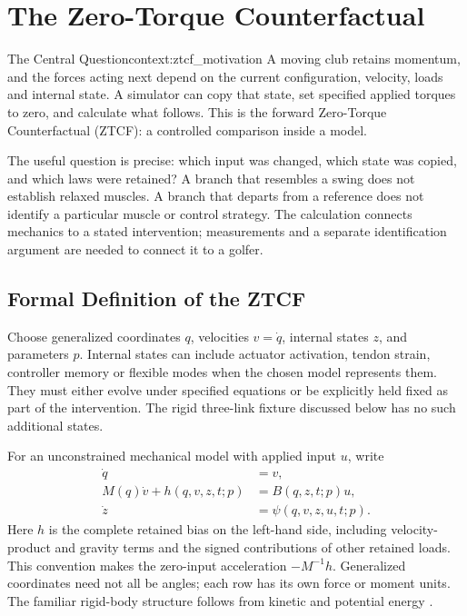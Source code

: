 \chapter{The Zero-Torque Counterfactual}
\label{ch:zero_torque_counterfactual}

\begin{laymansbox}{The Central Question}{context:ztcf_motivation}
A moving club retains momentum, and the forces acting next depend on the current configuration, velocity, loads and internal state. A simulator can copy that state, set specified applied torques to zero, and calculate what follows. This is the forward Zero-Torque Counterfactual (ZTCF): a controlled comparison inside a model.

The useful question is precise: which input was changed, which state was copied, and which laws were retained? A branch that resembles a swing does not establish relaxed muscles. A branch that departs from a reference does not identify a particular muscle or control strategy. The calculation connects mechanics to a stated intervention; measurements and a separate identification argument are needed to connect it to a golfer.
\end{laymansbox}

\section{Formal Definition of the ZTCF}
\label{sec:ztcf_formal_definition}

Choose generalized coordinates $q$, velocities $v=\dot q$, internal states $z$, and parameters $p$. Internal states can include actuator activation, tendon strain, controller memory or flexible modes when the chosen model represents them. They must either evolve under specified equations or be explicitly held fixed as part of the intervention. The rigid three-link fixture discussed below has no such additional states.

For an unconstrained mechanical model with applied input $u$, write
\begin{equation}
\begin{aligned}
\dot q&=v,\\
M(q)\dot v+h(q,v,z,t;p)&=B(q,z,t;p)u,\\
\dot z&=\psi(q,v,z,u,t;p).
\end{aligned}
\label{eq:ztcf_eom}
\end{equation}
Here $h$ is the complete retained bias on the left-hand side, including velocity-product and gravity terms and the signed contributions of other retained loads. This convention makes the zero-input acceleration $-M^{-1}h$. Generalized coordinates need not all be angles; each row has its own force or moment units. The familiar rigid-body structure follows from kinetic and potential energy \citep{Lynch2017,Featherstone2008}.

